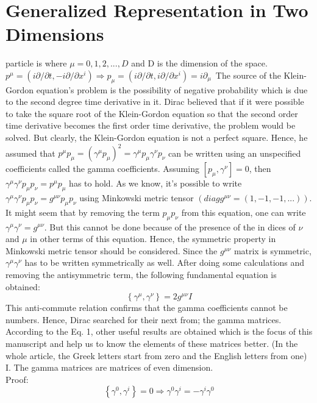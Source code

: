 \documentclass[twocolumn,aps,prb,showpacs]{revtex4-1}
\begin{document}
\section{Generalized Representation in Two Dimensions}
particle is  where $\mu=0,1,2,...,D$ and D is the dimension of the space. $p^{\mu}=(i\partial/\partial t , -i\partial/\partial x^{i})\Rightarrow p_{\mu}=(i\partial/\partial t , i\partial/\partial x^{i})=i\partial_{\mu} $\
The source of the Klein-Gordon equation's problem is the possibility of negative probability which is due to the second degree time derivative in it. Dirac believed that if it were possible to take the square root of the Klein-Gordon equation so that the second order time derivative becomes the first order time derivative, the problem would be solved. But clearly, the Klein-Gordon equation is not a perfect square. Hence, he assumed that $p^{\mu}p_{\mu}=(\gamma^{\mu}p_{\mu})^{2}=\gamma^{\mu}p_{\mu}\gamma^{\nu}p_{\nu}$ can be written using an unspecified coefficients called the gamma coefficients. Assuming $[p_\mu , \gamma^{\nu}]=0$, then $\gamma^{\mu}\gamma^{\nu}p_\mu p_\nu=p^\mu p_\mu$ has to hold. As we know, it's possible to write $\gamma^{\mu}\gamma^{\nu}p_\mu p_\nu=g^{\mu\nu}p_\mu p_\nu$ using Minkowski metric tensor $(diagg^{\mu\nu}=(1,-1,-1,...) )$. It might seem that by removing the term $p_\mu p_\nu$ from this equation, one can write $\gamma^{\mu}\gamma^{\nu}=g^{\mu\nu}$. But this cannot be done because of the presence of the in dices of $\nu$ and $\mu$ in other terms of this equation. Hence, the symmetric property in Minkowski metric tensor should be considered. Since the $g^{\mu\nu}$ matrix is symmetric, $\gamma^{\mu}\gamma^{\nu}$ has to be written symmetrically as well. After doing some calculations and removing the antisymmetric term, the following fundamental equation is obtained:
\begin{equation}
	\left\lbrace \gamma^{\mu},\gamma^{\nu}\right\rbrace =2g^{\mu\nu}I
\end{equation}
This anti-commute relation confirms that the gamma coefficients cannot be numbers. Hence, Dirac searched for their next from; the gamma matrices. 
According to the Eq. 1, other useful results are obtained which is the focus of this manuscript and help us to know the elements of these matrices better. (In the whole article, the Greek letters start from zero and the English letters from one)\\
I.	The gamma matrices are matrices of even dimension.\\
Proof:
$$
\left\lbrace\gamma^{0},\gamma^{i}\right\rbrace =0\Rightarrow\gamma^{0}\gamma^{i}=-\gamma^{i}\gamma^{0} $$
\end{document}
